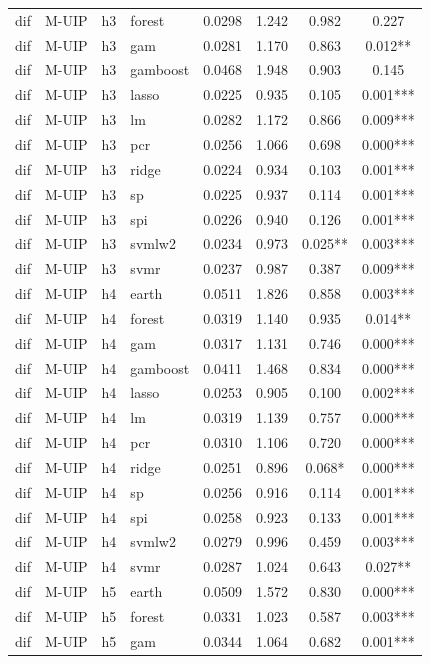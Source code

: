 \begin{ThreePartTable}
\begin{longtable}[t]{llclcccc}
dif & M-UIP & h3 & forest & 0.0298 & 1.242 & 0.982 & 0.227\\
dif & M-UIP & h3 & gam & 0.0281 & 1.170 & 0.863 & 0.012**\\
dif & M-UIP & h3 & gamboost & 0.0468 & 1.948 & 0.903 & 0.145\\
dif & M-UIP & h3 & lasso & 0.0225 & 0.935 & 0.105 & 0.001***\\
dif & M-UIP & h3 & lm & 0.0282 & 1.172 & 0.866 & 0.009***\\
dif & M-UIP & h3 & pcr & 0.0256 & 1.066 & 0.698 & 0.000***\\
dif & M-UIP & h3 & ridge & 0.0224 & 0.934 & 0.103 & 0.001***\\
dif & M-UIP & h3 & sp & 0.0225 & 0.937 & 0.114 & 0.001***\\
dif & M-UIP & h3 & spi & 0.0226 & 0.940 & 0.126 & 0.001***\\
dif & M-UIP & h3 & svmlw2 & 0.0234 & 0.973 & 0.025** & 0.003***\\
dif & M-UIP & h3 & svmr & 0.0237 & 0.987 & 0.387 & 0.009***\\
\addlinespace
dif & M-UIP & h4 & earth & 0.0511 & 1.826 & 0.858 & 0.003***\\
dif & M-UIP & h4 & forest & 0.0319 & 1.140 & 0.935 & 0.014**\\
dif & M-UIP & h4 & gam & 0.0317 & 1.131 & 0.746 & 0.000***\\
dif & M-UIP & h4 & gamboost & 0.0411 & 1.468 & 0.834 & 0.000***\\
dif & M-UIP & h4 & lasso & 0.0253 & 0.905 & 0.100 & 0.002***\\
dif & M-UIP & h4 & lm & 0.0319 & 1.139 & 0.757 & 0.000***\\
dif & M-UIP & h4 & pcr & 0.0310 & 1.106 & 0.720 & 0.000***\\
dif & M-UIP & h4 & ridge & 0.0251 & 0.896 & 0.068* & 0.000***\\
dif & M-UIP & h4 & sp & 0.0256 & 0.916 & 0.114 & 0.001***\\
dif & M-UIP & h4 & spi & 0.0258 & 0.923 & 0.133 & 0.001***\\
dif & M-UIP & h4 & svmlw2 & 0.0279 & 0.996 & 0.459 & 0.003***\\
dif & M-UIP & h4 & svmr & 0.0287 & 1.024 & 0.643 & 0.027**\\
\addlinespace
dif & M-UIP & h5 & earth & 0.0509 & 1.572 & 0.830 & 0.000***\\
dif & M-UIP & h5 & forest & 0.0331 & 1.023 & 0.587 & 0.003***\\
dif & M-UIP & h5 & gam & 0.0344 & 1.064 & 0.682 & 0.001***\\

\end{longtable}
\end{ThreePartTable}
